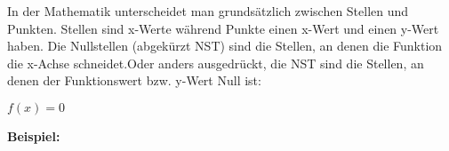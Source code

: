 In der Mathematik unterscheidet man grundsätzlich zwischen Stellen und Punkten. Stellen sind x-Werte während Punkte einen x-Wert und einen y-Wert haben. Die Nullstellen (abgekürzt NST) sind die Stellen, an denen die Funktion die x-Achse schneidet.Oder anders ausgedrückt, die NST sind die Stellen, an denen der Funktionswert bzw. y-Wert Null ist:
\begin{tcolorbox}
	\centering
	\textcolor{loestc}{\(f(x)=0\)}
\end{tcolorbox}

\textbf{Beispiel:}

%
%

